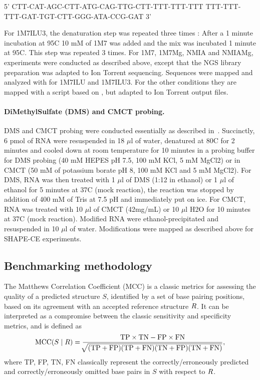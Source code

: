 \documentclass[a4,center,fleqn]{NAR}
\begin{document}
{\centering {}%
5' CTT-CAT-AGC-CTT-ATG-CAG-TTG-CTT-TTT-TTT-TTT
   TTT-TTT-TTT-GAT-TGT-CTT-GGG-ATA-CCG-GAT 3'\\}

For 1M7ILU3, the denaturation step was repeated three times : After a 1 minute incubation at 95\degree{}C 10 mM of 1M7 was added and the mix was incubated 1 minute at 95\degree{}C. This step was repeated 3 times. For 1M7, 1M7Mg, NMIA and NMIAMg, experiments were conducted as described above, except that the NGS library preparation was adapted to Ion Torrent sequencing. Sequences were mapped and analyzed with  for 1M7ILU and 1M7ILU3. For the other conditions they are mapped with a script based on , but adapted to Ion Torrent output files.


\paragraph{DiMethylSulfate (DMS) and CMCT probing.}
DMS and CMCT probing were conducted essentially as described in~\cite{Weill2004,James2008}. Succinctly, 6 pmol of RNA were resuspended in 18 $\mu$l of water, denatured at 80\degree{}C for 2 minutes and cooled down at room temperature for 10 minutes in a probing buffer for DMS probing (40 mM HEPES pH 7.5, 100 mM KCl, 5 mM MgCl2) or in CMCT (50 mM of potassium borate pH 8, 100 mM KCl and 5 mM MgCl2). For DMS, RNA was then treated with 1 $\mu$l of DMS (1:12 in ethanol) or 1 $\mu$l of ethanol for 5 minutes at 37\degree{}C (mock reaction), the reaction was stopped by addition of 400 mM of Tris at 7.5 pH and immediately put on ice. For CMCT,  RNA was treated with 10 $\mu$l of CMCT (42mg/mL) or 10 $\mu$l H2O for 10 minutes at 37\degree{}C (mock reaction). Modified RNA were ethanol-precipitated and resuspended in 10 $\mu$l of water. Modifications were mapped as described above for SHAPE-CE experiments.


\subsection*{Benchmarking methodology}

The Matthews Correlation Coefficient (MCC) is a classic metrics for assessing the quality of a predicted structure $S$, identified by a set of base pairing positions, based on its agreement with an accepted reference structure $R$. It can be interpreted as a compromise between the classic sensitivity and specificity metrics, and is defined as 
$$\text{MCC}(S\mid R)=\frac{\text{TP} \times \text{TN} -\text{FP} \times \text{FN}}{\sqrt[]{(\text{TP}+\text{FP})(\text{TP}+\text{FN})(\text{TN}+\text{FP})(\text{TN}+\text{FN})}},$$
where TP, FP, TN, FN classically represent the correctly/erroneously predicted and correctly/erroneously omitted base pairs in $S$ with respect to $R$.
\end{document}
